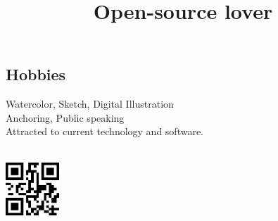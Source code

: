 \documentclass[mm]{simple_style}
\begin{document}
\begin{resume}
\section{Hobbies}
\begin{project}
\title{Open-source lover}
\end{project}
 Watercolor, Sketch, Digital Illustration\\
 Anchoring, Public speaking\\
 Attracted to current technology and software.\\
\hspace\\
\vspace{-2ex}
\sectionline
\vspace{133mm}
\begin{center}
\hspace{-200mm}
    \includegraphics[width=20mm, hight=20mm right]{qr/qrTel.png}\\
\end{center}
\end{resume}
\end{document}
